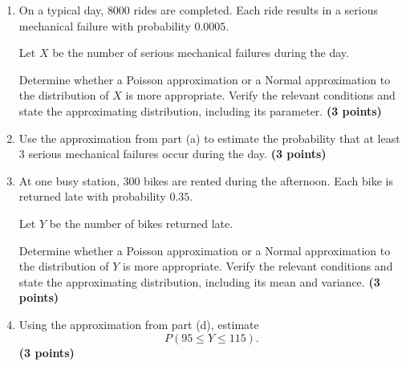 \documentclass[11pt]{article}
\begin{document}
\begin{enumerate}[label=(\alph*),leftmargin=*,itemsep=0.9em]

    \item On a typical day, \(8000\) rides are completed. Each ride results
    in a serious mechanical failure with probability \(0.0005\).

    Let \(X\) be the number of serious mechanical failures during the day.

    Determine whether a Poisson approximation or a Normal approximation to
    the distribution of \(X\) is more appropriate. Verify the relevant
    conditions and state the approximating distribution, including its
    parameter.
    \hfill \textbf{(3 points)}

    \item Use the approximation from part (a) to estimate the probability
    that at least \(3\) serious mechanical failures occur during the day.
    \hfill \textbf{(3 points)}
 

    \item At one busy station, \(300\) bikes are rented during the afternoon.
    Each bike is returned late with probability \(0.35\).

    Let \(Y\) be the number of bikes returned late.

    Determine whether a Poisson approximation or a Normal approximation to
    the distribution of \(Y\) is more appropriate. Verify the relevant
    conditions and state the approximating distribution, including its mean
    and variance.
    \hfill \textbf{(3 points)}

    \item Using the approximation from part (d), estimate
    \[
    P(95\leq Y\leq115).
    \]
    \hfill \textbf{(3 points)}

\end{enumerate}
\end{document}
